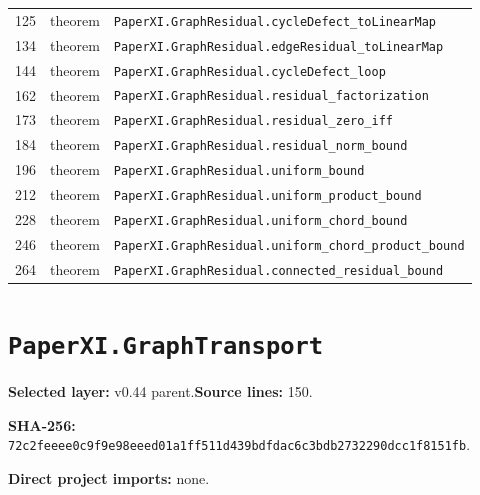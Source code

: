 \documentclass[10pt,oneside]{book}
\begin{document}
\begin{longtable}{@{}p{}p{}p{}@{}}
125&theorem&\nolinkurl{PaperXI.GraphResidual.cycleDefect_toLinearMap}\\

134&theorem&\nolinkurl{PaperXI.GraphResidual.edgeResidual_toLinearMap}\\

144&theorem&\nolinkurl{PaperXI.GraphResidual.cycleDefect_loop}\\

162&theorem&\nolinkurl{PaperXI.GraphResidual.residual_factorization}\\

173&theorem&\nolinkurl{PaperXI.GraphResidual.residual_zero_iff}\\

184&theorem&\nolinkurl{PaperXI.GraphResidual.residual_norm_bound}\\

196&theorem&\nolinkurl{PaperXI.GraphResidual.uniform_bound}\\

212&theorem&\nolinkurl{PaperXI.GraphResidual.uniform_product_bound}\\

228&theorem&\nolinkurl{PaperXI.GraphResidual.uniform_chord_bound}\\

246&theorem&\nolinkurl{PaperXI.GraphResidual.uniform_chord_product_bound}\\

264&theorem&\nolinkurl{PaperXI.GraphResidual.connected_residual_bound}\\

\bottomrule\end{longtable}

\section{\texorpdfstring{\nolinkurl{PaperXI.GraphTransport}}{PaperXI.GraphTransport}}\label{module:PaperXI.GraphTransport}

\textbf{Selected layer:} v0.44 parent.\quad\textbf{Source lines:} 150.\par\textbf{SHA-256:} {\scriptsize\nolinkurl{72c2feeee0c9f9e98eeed01a1ff511d439bdfdac6c3bdb2732290dcc1f8151fb}}.


\textbf{Direct project imports:} none.
\end{document}
